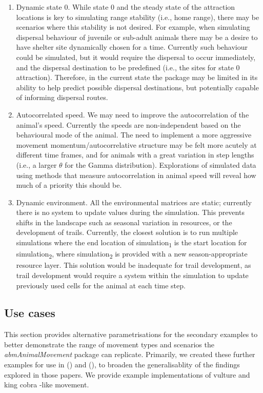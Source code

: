 \documentclass[10pt,a4paper]{article}
\begin{document}
\begin{enumerate}
\def\labelenumi{\arabic{enumi}.}
\item
  Dynamic state 0. While state 0 and the steady state of the attraction locations is key to simulating range stability (i.e., home range), there may be scenarios where this stability is not desired.
  For example, when simulating dispersal behaviour of juvenile or sub-adult animals there may be a desire to have shelter site dynamically chosen for a time.
  Currently such behaviour could be simulated, but it would require the dispersal to occur immediately, and the dispersal destination to be predefined (i.e., the sites for state 0 attraction).
  Therefore, in the current state the package may be limited in its ability to help predict possible dispersal destinations, but potentially capable of informing dispersal routes.
\item
  Autocorrelated speed. We may need to improve the autocorrelation of the animal's speed.
  Currently the speeds are non-independent based on the behavioural mode of the animal.
  The need to implement a more aggressive movement momentum/autocorrelative structure may be felt more acutely at different time frames, and for animals with a great variation in step lengths (i.e., a larger \(\theta\) for the Gamma distribution).
  Explorations of simulated data using methods that measure autocorrelation in animal speed will reveal how much of a priority this should be.
\item
  Dynamic environment. All the environmental matrices are static; currently there is no system to update values during the simulation.
  This prevents shifts in the landscape such as seasonal variation in resources, or the development of trails.
  Currently, the closest solution is to run multiple simulations where the end location of simulation\textsubscript{1} is the start location for simulation\textsubscript{2}, where simulation\textsubscript{2} is provided with a new season-appropriate resource layer.
  This solution would be inadequate for trail development, as trail development would require a system within the simulation to update previously used cells for the animal at each time step.
\end{enumerate}

\subsection{Use cases}\label{use-cases}

This section provides alternative parametrisations for the secondary examples to better demonstrate the range of movement types and scenarios the \emph{abmAnimalMovement} package can replicate.
Primarily, we created these further examples for use in () and (), to broaden the generalisablity of the findings explored in those papers.
We provide example implementations of vulture and king cobra -like movement.
\end{document}
